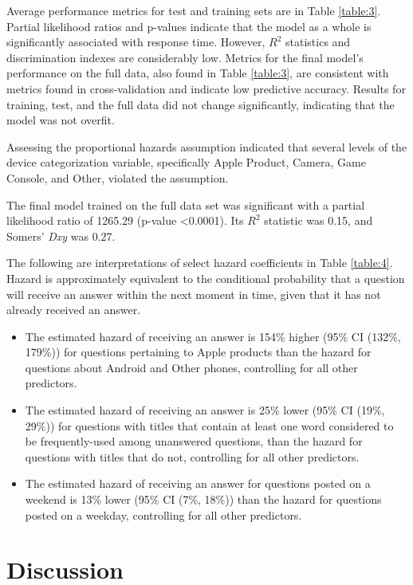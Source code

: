 \documentclass[]{interact}\usepackage[]{graphicx}\usepackage[]{color}
\begin{document}
Average performance metrics for test and training sets are in Table \ref{table:3}. Partial likelihood ratios and p-values indicate that the model as a whole is significantly associated with response time. However, $R^2$ statistics and discrimination indexes are considerably low. Metrics for the final model's performance on the full data, also found in Table \ref{table:3}, are consistent with metrics found in cross-validation and indicate low predictive accuracy. Results for training, test, and the full data did not change significantly, indicating that the model was not overfit. 



Assessing the proportional hazards assumption indicated that several levels of the device categorization variable, specifically Apple Product, Camera, Game Console, and Other, violated the assumption. 

The final model trained on the full data set was significant with a partial likelihood ratio of 1265.29 (p-value \textless0.0001). Its $R^2$ statistic was 0.15, and Somers' \textit{Dxy} was 0.27. 

The following are interpretations of select hazard coefficients in Table \ref{table:4}. Hazard is approximately equivalent to the conditional probability that a question will receive an answer within the next moment in time, given that it has not already received an answer. 




\begin{itemize}
  \item The estimated hazard of receiving an answer is 154\% higher (95\% CI (132\%, 179\%)) for questions pertaining to Apple products than the hazard for questions about Android and Other phones, controlling for all other predictors.
  \item The estimated hazard of receiving an answer is 25\% lower (95\% CI (19\%, 29\%)) for questions with titles that contain at least one word considered to be frequently-used among unanswered questions, than the hazard for questions with titles that do not, controlling for all other predictors. 
  \item The estimated hazard of receiving an answer for questions posted on a weekend is 13\% lower (95\% CI (7\%, 18\%)) than the hazard for questions posted on a weekday, controlling for all other predictors.
\end{itemize}


\section{Discussion}
\end{document}
